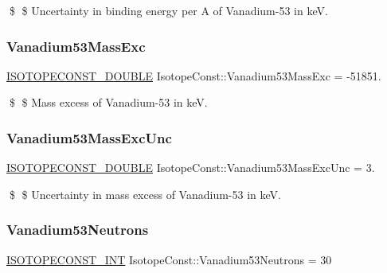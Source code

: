 \$ \$ Uncertainty in binding energy per A of Vanadium-\/53 in keV. \mbox{\label{group___isotope_const-_vanadium-_v53_ga3344c6c120ed38779a9da5a24cb7e78a}} 
\subsubsection{\texorpdfstring{Vanadium53\+Mass\+Exc}{Vanadium53MassExc}}
{\footnotesize\ttfamily \mbox{\hyperlink{group___isotope_const-_macros_ga8f45a7272ce02c0b4c65c44636ed719a}{I\+S\+O\+T\+O\+P\+E\+C\+O\+N\+S\+T\+\_\+\+D\+O\+U\+B\+LE}} Isotope\+Const\+::\+Vanadium53\+Mass\+Exc = -\/51851.}

\$ \$ Mass excess of Vanadium-\/53 in keV. \mbox{\label{group___isotope_const-_vanadium-_v53_ga06e27a32590356190639e00a44cbcedb}} 
\subsubsection{\texorpdfstring{Vanadium53\+Mass\+Exc\+Unc}{Vanadium53MassExcUnc}}
{\footnotesize\ttfamily \mbox{\hyperlink{group___isotope_const-_macros_ga8f45a7272ce02c0b4c65c44636ed719a}{I\+S\+O\+T\+O\+P\+E\+C\+O\+N\+S\+T\+\_\+\+D\+O\+U\+B\+LE}} Isotope\+Const\+::\+Vanadium53\+Mass\+Exc\+Unc = 3.}

\$ \$ Uncertainty in mass excess of Vanadium-\/53 in keV. \mbox{\label{group___isotope_const-_vanadium-_v53_ga5643618a0936c2210dea1f535ee0b424}} 
\subsubsection{\texorpdfstring{Vanadium53\+Neutrons}{Vanadium53Neutrons}}
{\footnotesize\ttfamily \mbox{\hyperlink{group___isotope_const-_macros_ga5f18360b3e99483a35c32d789e62621c}{I\+S\+O\+T\+O\+P\+E\+C\+O\+N\+S\+T\+\_\+\+I\+NT}} Isotope\+Const\+::\+Vanadium53\+Neutrons = 30}

